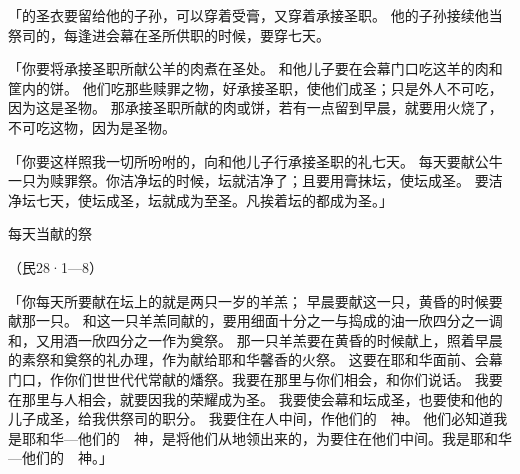 {\par }{\PP {}「{}的圣衣要留给他的子孙，可以穿着受膏，又穿着承接圣职。
他的子孙接续他当祭司的，每逢进会幕在圣所供职的时候，要穿七天。
\par }{\PP {}「你要将承接圣职所献公羊的肉煮在圣处。
和他儿子要在会幕门口吃这羊的肉和筐内的饼。
他们吃那些赎罪之物，好承接圣职，使他们成圣；只是外人不可吃，因为这是圣物。
那承接圣职所献的肉或饼，若有一点留到早晨，就要用火烧了，不可吃这物，因为是圣物。
\par }{\PP {}「你要这样照我一切所吩咐的，向{}和他儿子行承接圣职的礼七天。
每天要献公牛一只为赎罪祭。你洁净坛的时候，坛就洁净了；且要用膏抹坛，使坛成圣。
要洁净坛七天，使坛成圣，坛就成为至圣。凡挨着坛的都成为圣。」
\par }{\SH 每天当献的祭
\par }{\R （民28·1—8）
\par }{\PP {}「你每天所要献在坛上的就是两只一岁的羊羔；
早晨要献这一只，黄昏的时候要献那一只。
和这一只羊羔同献的，要用细面{}十分之一与捣成的油一欣四分之一调和，又用酒一欣四分之一作为奠祭。
那一只羊羔要在黄昏的时候献上，照着早晨的素祭和奠祭的礼办理，作为献给耶和华馨香的火祭。
这要在耶和华面前、会幕门口，作你们世世代代常献的燔祭。我要在那里与你们相会，和你们说话。
我要在那里与{}人相会，{}就要因我的荣耀成为圣。
我要使会幕和坛成圣，也要使{}和他的儿子成圣，给我供祭司的职分。
我要住在{}人中间，作他们的　神。
他们必知道我是耶和华—他们的　神，是将他们从{}地领出来的，为要住在他们中间。我是耶和华—他们的　神。」

}
